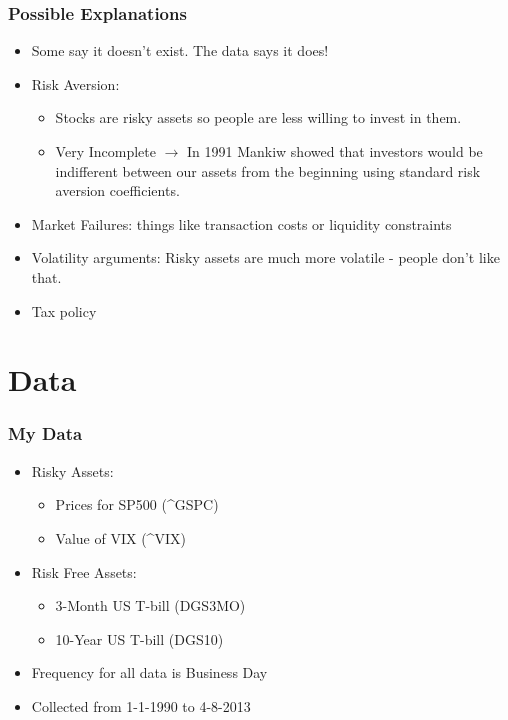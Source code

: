 \documentclass[11pt]{beamer}
\theoremstyle{definition}
\begin{document}
  \begin{frame}[t]\frametitle{Possible Explanations}
    \begin{itemize}[<+->]
      \item Some say it doesn't exist. The data says it does!
      \item Risk Aversion:
      \begin{itemize}
        \item Stocks are risky assets so people are less willing to invest in them.
        \item Very Incomplete $\rightarrow$ In 1991 Mankiw showed that investors would be indifferent between our assets from the beginning using standard risk aversion coefficients.
      \end{itemize}
      \item Market Failures: things like transaction costs or liquidity constraints
      \item Volatility arguments: Risky assets are much more volatile - people don't like that.
      \item Tax policy
    \end{itemize}
  \end{frame}

\section{Data}

  \begin{frame} \frametitle{My Data}
    \begin{itemize}
      \item Risky Assets:
        \begin{itemize}
           \item Prices for SP500 (\^{}GSPC)
           \item Value of VIX (\^{}VIX)
         \end{itemize}
      \item Risk Free Assets:
        \begin{itemize}
          \item 3-Month US T-bill (DGS3MO)
          \item 10-Year US T-bill (DGS10)
        \end{itemize}
        \item Frequency for all data is Business Day
        \item Collected from 1-1-1990 to 4-8-2013
    \end{itemize}
  \end{frame}
\end{document}
